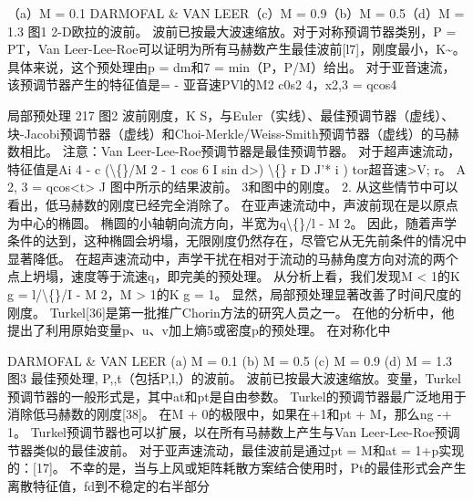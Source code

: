 \documentclass[UTF8,11pt,a4paper,openany,fontset=fandol]{ctexbook}
\begin{document}
（a）M = 0.1 DARMOFAL \& VAN LEER（c）M = 0.9（b）M = 0.5（d）M = 1.3 图1 2-D欧拉的波前。 波前已按最大波速缩放。对于对称预调节器类别，P = PT，Van Leer-Lee-Roe可以证明为所有马赫数产生最佳波前[l7]，刚度最小，K\textasciitilde{}。 具体来说，这个预处理由p = dm和7 = min（P，P/M）给出。 对于亚音速流，该预调节器产生的特征值是= - 亚音速PVl的M2 c0s2 4，x2,3 = qcos4

局部预处理 217 图2 波前刚度，K S，与Euler（实线）、最佳预调节器（虚线）、块-Jacobi预调节器（虚线）和Choi-Merkle/Weiss-Smith预调节器（虚线）的马赫数相比。 注意：Van Leer-Lee-Roe预调节器是最佳预调节器。 对于超声速流动，特征值是Ai 4 - c (\textbackslash\{\}/M 2 - 1 cos 6 I sin d>) \textbackslash\{\} r D J'* i ) tor超音速>V; r。 A 2, 3 = qcos<t> J 图中所示的结果波前。 3和图中的刚度。 2. 从这些情节中可以看出，低马赫数的刚度已经完全消除了。 在亚声速流动中，声波前现在是以原点为中心的椭圆。 椭圆的小轴朝向流方向，半宽为q\textbackslash\{\}/l - M 2。 因此，随着声学条件的达到，这种椭圆会坍塌，无限刚度仍然存在，尽管它从无先前条件的情况中显著降低。 在超声速流动中，声学干扰在相对于流动的马赫角度方向对流的两个点上坍塌，速度等于流速q，即完美的预处理。 从分析上看，我们发现M < 1的K g = l/\textbackslash\{\}/I - M 2，M > 1的K g = 1。 显然，局部预处理显著改善了时间尺度的刚度。 Turkel[36]是第一批推广Chorin方法的研究人员之一。 在他的分析中，他提出了利用原始变量p、u、v加上熵5或密度p的预处理。 在对称化中

DARMOFAL \& VAN LEER (a) M = 0.1 (b) M = 0.5 (c) M = 0.9 (d) M = 1.3 图3 最佳预处理, P,,t（包括P,l,）的波前。 波前已按最大波速缩放。变量，Turkel预调节器的一般形式是，其中at和pt是自由参数。 Turkel的预调节器最广泛地用于消除低马赫数的刚度[38]。 在M + 0的极限中，如果在+1和pt + M，那么ng -+ 1。 Turkel预调节器也可以扩展，以在所有马赫数上产生与Van Leer-Lee-Roe预调节器类似的最佳波前。 对于亚声速流动，最佳波前是通过pt = M和at = 1+p实现的：[17]。 不幸的是，当与上风或矩阵耗散方案结合使用时，Pt的最佳形式会产生离散特征值，fd到不稳定的右半部分
\end{document}
